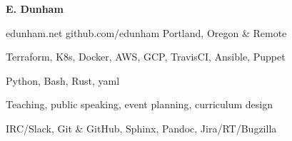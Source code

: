 \documentclass[11pt]{article} %
\begin{document}
\centerline{{\Huge \bf E. Dunham}}

\bigskip

        {edunham.net}
        {github.com/edunham}
        {Portland, Oregon \& Remote}


      {Terraform, K8s, Docker, AWS, GCP, TravisCI, Ansible, Puppet}

      {Python, Bash, Rust, yaml}

      {Teaching, public speaking, event planning, curriculum design}

      {IRC/Slack, Git \& GitHub, Sphinx, Pandoc, Jira/RT/Bugzilla}


\end{document}
